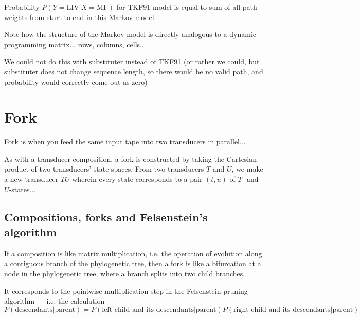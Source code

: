 \documentclass{article}
\newcommand{\seclabel}[1]{\label{sec.#1}}
\begin{document}
Probability $P(Y=\mbox{LIV}|X=\mbox{MF})$ for TKF91 model
is equal to sum of all path weights from start to end in this Markov model...

Note how the structure of the Markov model is directly analogous to a dynamic programming matrix...
rows, columns, cells...

We could not do this with substituter instead of TKF91
(or rather we could, but substituter does not change sequence length,
so there would be no valid path, and probability would correctly come out as zero)

\section{Fork}

Fork is when you feed the same input tape into two transducers in parallel...

As with a transducer composition,
a fork is constructed by taking the Cartesian product of two transducers' state spaces.
From two transducers $T$ and $U$,
we make a new transducer $TU$
wherein every state corresponds to a pair $(t,u)$ of $T$- and $U$-states...

\subsection{Compositions, forks and Felsenstein's algorithm}
\seclabel{Felsenstein}

If a composition is like matrix multiplication,
i.e. the operation of evolution along a contiguous branch of the phylogenetic tree,
then a fork is like a bifurcation at a node in the phylogenetic tree,
where a branch splits into two child branches.

It corresponds to the pointwise multiplication step in the Felsenstein pruning algorithm ---
i.e. the calculation
\[
P(\mbox{descendants}|\mbox{parent}) =
P(\mbox{left child and its descendants}|\mbox{parent})
P(\mbox{right child and its descendants}|\mbox{parent})
\]
\end{document}
